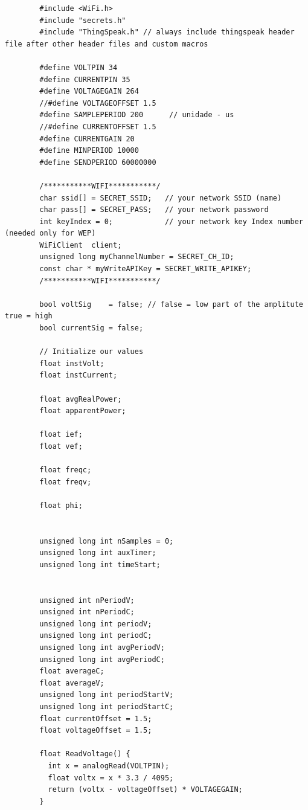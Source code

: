 \documentclass[12pt]{article}
\begin{document}
    \begin{lstlisting}
        #include <WiFi.h>
        #include "secrets.h"
        #include "ThingSpeak.h" // always include thingspeak header file after other header files and custom macros
        
        #define VOLTPIN 34
        #define CURRENTPIN 35
        #define VOLTAGEGAIN 264
        //#define VOLTAGEOFFSET 1.5
        #define SAMPLEPERIOD 200      // unidade - us
        //#define CURRENTOFFSET 1.5
        #define CURRENTGAIN 20
        #define MINPERIOD 10000
        #define SENDPERIOD 60000000
        
        /***********WIFI***********/
        char ssid[] = SECRET_SSID;   // your network SSID (name)
        char pass[] = SECRET_PASS;   // your network password
        int keyIndex = 0;            // your network key Index number (needed only for WEP)
        WiFiClient  client;
        unsigned long myChannelNumber = SECRET_CH_ID;
        const char * myWriteAPIKey = SECRET_WRITE_APIKEY;
        /***********WIFI***********/
        
        bool voltSig    = false; // false = low part of the amplitute true = high
        bool currentSig = false;
        
        // Initialize our values
        float instVolt;
        float instCurrent;
        
        float avgRealPower;
        float apparentPower;
        
        float ief;
        float vef;
        
        float freqc;
        float freqv;
        
        float phi;
        
        
        unsigned long int nSamples = 0;
        unsigned long int auxTimer;
        unsigned long int timeStart;
        
        
        unsigned int nPeriodV;
        unsigned int nPeriodC;
        unsigned long int periodV;
        unsigned long int periodC;
        unsigned long int avgPeriodV;
        unsigned long int avgPeriodC;
        float averageC;
        float averageV;
        unsigned long int periodStartV;
        unsigned long int periodStartC;
        float currentOffset = 1.5;
        float voltageOffset = 1.5;
        
        float ReadVoltage() {
          int x = analogRead(VOLTPIN);
          float voltx = x * 3.3 / 4095;
          return (voltx - voltageOffset) * VOLTAGEGAIN;
        }
        

\end{lstlisting}
\end{document}
